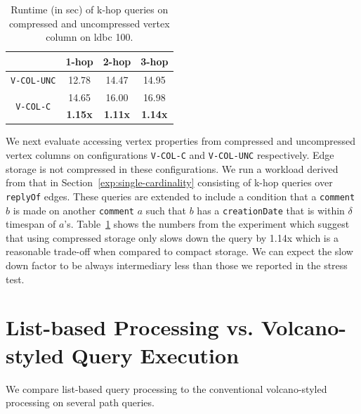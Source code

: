 \begin{table}
	\centering
	\bgroup
	\setlength{\tabcolsep}{8pt}
	\def\arraystretch{1.2}%
	\begin{tabular}{ |c|c|c|c| } 
		\hline
		& \textbf{1-hop} & \textbf{2-hop} & \textbf{3-hop} \\
		\hline \hline
		\texttt{V-COL-UNC}& 12.78 & 14.47 & 14.95\\ 
		\hline
		\multirow{2}{*}{\texttt{V-COL-C}}& 14.65 & 16.00 & 16.98 \\ 
		& \textbf{1.15x} & \textbf{1.11x} & \textbf{1.14x}\\ 
		\hline  
	\end{tabular}
	\egroup
	\captionsetup{justification=centering}
	\caption{Runtime (in sec) of k-hop queries on compressed and uncompressed vertex column on \gls{ldbc} 100.}
	\label{tbl:s3}
\end{table}

We next evaluate accessing vertex properties from compressed and uncompressed vertex columns on configurations \texttt{V-COL-C} and \texttt{V-COL-UNC} respectively. Edge storage is not compressed in these configurations. We run a workload derived from that in Section~\ref{exp:single-cardinality} consisting of k-hop queries over \texttt{replyOf} edges. These queries are extended to include a condition that a \texttt{comment} $b$ is made on another \texttt{comment} $a$ such that $b$ has a \texttt{creationDate} that is within $\delta$ timespan of $a$'s. Table~\ref{tbl:s3} shows the numbers from the experiment which suggest that using compressed storage only slows down the query by 1.14x which is a reasonable trade-off when compared to compact storage. We can expect the slow down factor to be always intermediary less than those we reported in the stress test.

\section{List-based Processing vs. Volcano-styled Query Execution}
\label{exp:list-based}

We compare list-based query processing to the conventional volcano-styled processing on several path queries.





















